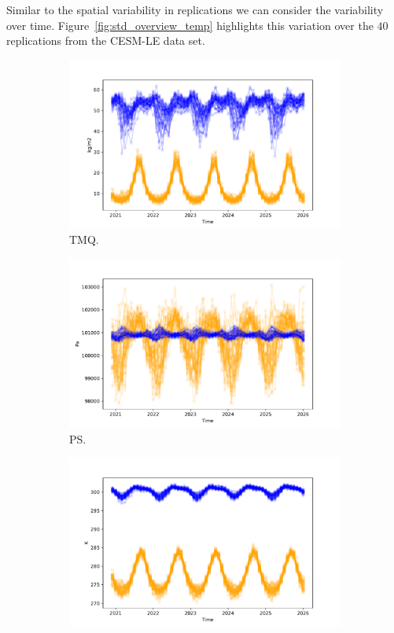 Similar to the spatial variability in replications we can consider the variability over time.
Figure~\ref{fig:std_overview_temp} highlights this variation over the $40$ replications from the CESM-LE data set. 

\begin{figure}[htbp!] 
	\centering
	\begin{subfigure}[b]{0.45\textwidth}
		\includegraphics[width=\textwidth]{TMQ_std_temp}
		\caption{TMQ.}
		\label{fig:std_precip_temp}   
	\end{subfigure}             
	\begin{subfigure}[b]{0.45\textwidth}
		\includegraphics[width=\textwidth]{PS_std_temp}
		\caption{PS.}
		\label{fig:std_pressure_temp}
	\end{subfigure}             
	\hfill
	\begin{subfigure}[b]{0.45\textwidth}
		\includegraphics[width=\textwidth]{TREFHT_std_temp}

\end{subfigure}
\end{figure}
